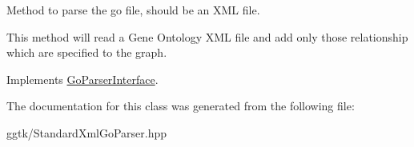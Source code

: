 Method to parse the go file, should be an X\+ML file. 

This method will read a Gene Ontology X\+ML file and add only those relationship which are specified to the graph. 

Implements \hyperlink{classGoParserInterface_aefde440e0d5404b9efa2a16a89e09674}{Go\+Parser\+Interface}.



The documentation for this class was generated from the following file\+:\begin{DoxyCompactItemize}
\item 
ggtk/Standard\+Xml\+Go\+Parser.\+hpp\end{DoxyCompactItemize}
